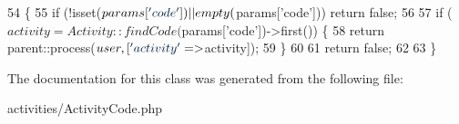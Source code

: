 \begin{DoxyCode}
54     \{
55         \textcolor{keywordflow}{if} (!isset($params[\textcolor{stringliteral}{'code'}]) || empty($params[\textcolor{stringliteral}{'code'}])) \textcolor{keywordflow}{return} \textcolor{keyword}{false};
56 
57         \textcolor{keywordflow}{if} ($activity = Activity::findCode($params[\textcolor{stringliteral}{'code'}])->first()) \{
58             \textcolor{keywordflow}{return} parent::process($user, [\textcolor{stringliteral}{'activity'} => $activity]);
59         \}
60 
61         \textcolor{keywordflow}{return} \textcolor{keyword}{false};
62 
63     \}
\end{DoxyCode}


The documentation for this class was generated from the following file\+:\begin{DoxyCompactItemize}
\item 
activities/Activity\+Code.\+php\end{DoxyCompactItemize}

